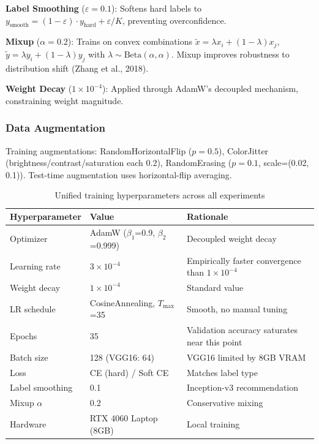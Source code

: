 \documentclass[12pt,a4paper]{article}
\begin{document}
\textbf{Label Smoothing} ($\varepsilon=0.1$): Softens hard labels to $y_{\text{smooth}} = (1-\varepsilon) \cdot y_{\text{hard}} + \varepsilon/K$, preventing overconfidence.

\textbf{Mixup} ($\alpha=0.2$): Trains on convex combinations $\tilde{x} = \lambda x_i + (1-\lambda) x_j$, $\tilde{y} = \lambda y_i + (1-\lambda) y_j$ with $\lambda \sim \text{Beta}(\alpha,\alpha)$. Mixup improves robustness to distribution shift (Zhang et al., 2018).

\textbf{Weight Decay} ($1\times10^{-4}$): Applied through AdamW's decoupled mechanism, constraining weight magnitude.

\subsubsection{Data Augmentation}

Training augmentations: RandomHorizontalFlip ($p=0.5$), ColorJitter (brightness/contrast/saturation each 0.2), RandomErasing ($p=0.1$, scale=(0.02, 0.1)). Test-time augmentation uses horizontal-flip averaging.

\begin{table}[H]
\centering
\caption{Unified training hyperparameters across all experiments}
\begin{tabular}{lll}
\toprule
Hyperparameter & Value & Rationale \\
\midrule
Optimizer & AdamW ($\beta_1$=0.9, $\beta_2$=0.999) & Decoupled weight decay \\
Learning rate & $3\times10^{-4}$ & Empirically faster convergence than $1\times10^{-4}$ \\
Weight decay & $1\times10^{-4}$ & Standard value \\
LR schedule & CosineAnnealing, $T_{\max}$=35 & Smooth, no manual tuning \\
Epochs & 35 & Validation accuracy saturates near this point \\
Batch size & 128 (VGG16: 64) & VGG16 limited by 8GB VRAM \\
Loss & CE (hard) / Soft CE & Matches label type \\
Label smoothing & 0.1 & Inception-v3 recommendation \\
Mixup $\alpha$ & 0.2 & Conservative mixing \\
Hardware & RTX 4060 Laptop (8GB) & Local training \\
\bottomrule
\end{tabular}
\end{table}
\end{document}
